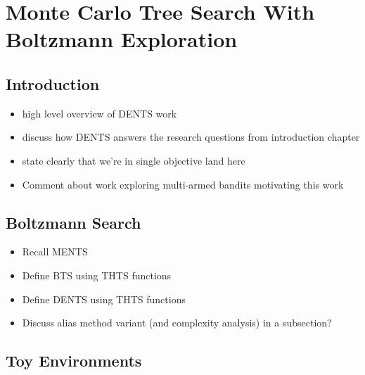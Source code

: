

\chapter{\label{ch:4-dents}Monte Carlo Tree Search With Boltzmann Exploration} 

    \minitoc

\section{Introduction}
\label{sec:4-1-intro}

    \begin{itemize}
        \item high level overview of DENTS work
        \item discuss how DENTS answers the research questions from introduction chapter
        \item state clearly that we're in single objective land here
        \item Comment about work exploring multi-armed bandits motivating this work
    \end{itemize}

\section{Boltzmann Search}
\label{sec:4-2-boltzmannsearch}

    \begin{itemize}
        \item Recall MENTS
        \item Define BTS using THTS functions
        \item Define DENTS using THTS functions
        \item Discuss alias method variant (and complexity analysis) in a subsection?
    \end{itemize}

\section{Toy Environments}
\label{sec:4-3-toyenvs}

